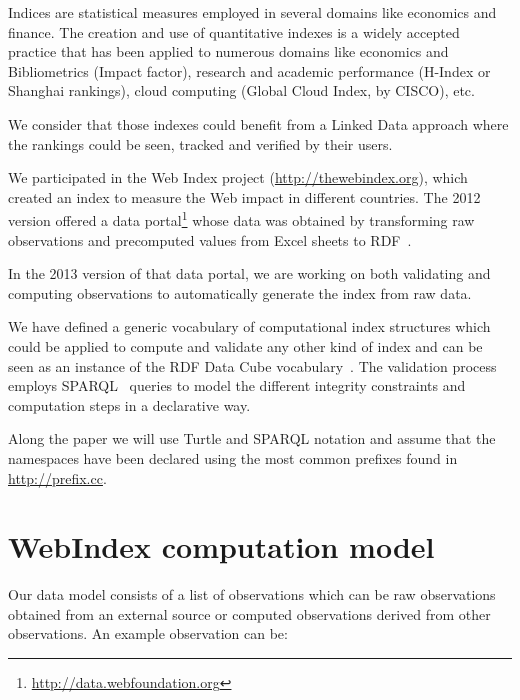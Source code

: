 \documentclass{acm_proc_article-sp}
\newcommand{\footnoteUrl}[1]{\footnote{\url{#1}}}
\begin{document}
Indices are statistical measures employed in several domains like economics and finance. 
The creation and use of quantitative indexes is a widely 
accepted practice that has been applied to numerous domains like economics and
Bibliometrics (Impact factor), 
research and academic performance 
  (H-Index or Shanghai rankings), 
 cloud computing (Global Cloud Index, by CISCO), 
etc.

We consider that those indexes could benefit from a 
 Linked Data approach where the rankings could be seen, tracked and 
 verified by their users.

We participated in the Web Index project
(\url{http://thewebindex.org}), which created an index to measure 
 the Web impact in different countries.
The 2012 version offered a data
portal\footnoteUrl{http://data.webfoundation.org} whose data was obtained 
by transforming raw observations and precomputed values 
from Excel sheets to RDF~\cite{Alvarez13}. 

In the 2013 version of that data portal, we are working on 
both validating and computing observations to automatically generate
the index from raw data.

We have defined a generic vocabulary 
of computational index structures which could be applied to compute and validate any other kind of
index and can be seen as an instance of the RDF Data Cube
vocabulary~\cite{Cube}.
The validation process employs SPARQL~\cite{SPARQL11} queries to model the 
 different integrity constraints and computation steps in a declarative way.



 Along the paper we will use Turtle and SPARQL notation and assume that the
namespaces have been declared using the most common prefixes found in
\url{http://prefix.cc}.

\section{WebIndex computation model}

Our data model consists of a list of observations which can be raw observations
obtained from an external source or computed observations derived from other
observations. An example observation can be:
\end{document}
